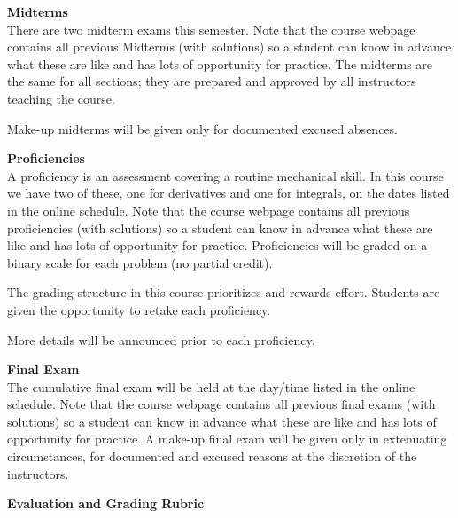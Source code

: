\documentclass[12pt]{article}
\renewcommand{\emph}[1]{\textsf{\textbf{#1}}}
\newcommand{\localhead}[1]{\par\smallskip\textbf{#1}\nobreak\\}%
\def\heading#1{\localhead{\large\emph{#1}}}
\begin{document}
\heading{Midterms}
There are two midterm exams this semester. Note that the course webpage contains all previous Midterms (with solutions) so a student can know in advance what these are like and has lots of opportunity for practice. The midterms are the same 
for all sections; they are prepared and approved by all instructors teaching the course. 

Make-up midterms will be given only for documented excused absences.

\heading{Proficiencies}
A proficiency is an assessment covering a routine mechanical skill.  In
this course we have two of these, one for derivatives and one for 
integrals, on the dates listed in the online schedule. Note that the course webpage contains all previous proficiencies (with solutions) so a student can know in advance what these are like and has lots of opportunity for practice.
Proficiencies will be graded on a binary scale for each problem
(no partial credit).  


The grading structure in this course prioritizes and rewards effort. Students are given the opportunity to retake each proficiency. 

More details will be announced prior to each proficiency.

\heading{Final Exam} 
The cumulative final exam will be held at the day/time listed in the
online schedule. Note that the course webpage contains all previous final exams (with solutions) so a student can know in advance what these are like  and has lots of opportunity for practice.
A make-up final exam will be given only in extenuating circumstances, for documented and excused reasons at the discretion of the instructors.

\heading{Evaluation and Grading Rubric}
\end{document}
